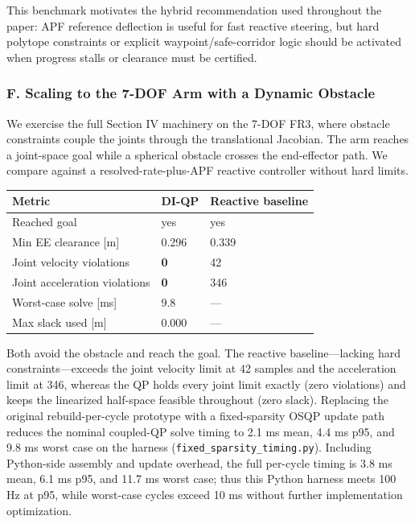 This benchmark motivates the hybrid recommendation used throughout the
paper: APF reference deflection is useful for fast reactive steering,
but hard polytope constraints or explicit waypoint/safe-corridor logic
should be activated when progress stalls or clearance must be certified.

\subsubsection{F. Scaling to the 7-DOF Arm with a Dynamic
Obstacle}\label{f.-scaling-to-the-7-dof-arm-with-a-dynamic-obstacle}

We exercise the full Section IV machinery on the 7-DOF FR3, where
obstacle constraints couple the joints through the translational
Jacobian. The arm reaches a joint-space goal while a spherical obstacle
crosses the end-effector path. We compare against a
resolved-rate-plus-APF reactive controller without hard limits.

{\def\LTcaptype{none} %
\begin{longtable}[]{@{}lll@{}}
\toprule\noalign{}
Metric & DI-QP & Reactive baseline \\
\midrule\noalign{}
\endhead
\bottomrule\noalign{}
\endlastfoot
Reached goal & yes & yes \\
Min EE clearance {[}m{]} & 0.296 & 0.339 \\
Joint velocity violations & \textbf{0} & 42 \\
Joint acceleration violations & \textbf{0} & 346 \\
Worst-case solve {[}ms{]} & 9.8 & --- \\
Max slack used {[}m{]} & 0.000 & --- \\
\end{longtable}
}

Both avoid the obstacle and reach the goal. The reactive
baseline---lacking hard constraints---exceeds the joint velocity limit
at 42 samples and the acceleration limit at 346, whereas the QP holds
every joint limit exactly (zero violations) and keeps the linearized
half-space feasible throughout (zero slack). Replacing the original
rebuild-per-cycle prototype with a fixed-sparsity OSQP update path
reduces the nominal coupled-QP solve timing to 2.1 ms mean, 4.4 ms p95,
and 9.8 ms worst case on the harness
(\texttt{fixed\_sparsity\_timing.py}). Including Python-side assembly
and update overhead, the full per-cycle timing is 3.8 ms mean, 6.1 ms
p95, and 11.7 ms worst case; thus this Python harness meets 100 Hz at
p95, while worst-case cycles exceed 10 ms without further implementation
optimization.

